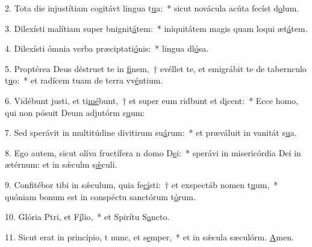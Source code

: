 2. Tota die injustítiam cogitávt lingua t\uline{u}a:~* sicut novácula acúta fecíst d\uline{o}lum.\par 
3. Dilexísti malítiam super bnignit\uline{á}tem:~* iniquitátem magis quam loqui æt\uline{á}tem.\par 
4. Dilexísti ómnia verba præciptati\uline{ó}nis:~* lingua dl\uline{ó}sa.\par 
5. Proptérea Deus déstruet te in \uline{fi}nem,~† evéllet te, et emigrábit te de tabernculo t\uline{u}o:~* et radícem tuam de terra vv\uline{é}ntium.\par 
6. Vidébunt justi, et ti\uline{mé}bunt,~† et super eum ridbunt et d\uline{i}cent:~* Ecce homo, qui non pósuit Deum adjutórm s\uline{u}um:\par 
7. Sed sperávit in multitúdine divitirum su\uline{á}rum:~* et præváluit in vanitát s\uline{u}a.\par 
8. Ego autem, sicut olíva fructífera n domo D\uline{e}i:~* sperávi in misericórdia Dei in ætérnum: et in sǽculm s\uline{ǽ}culi.\par 
9. Confitébor tibi in sǽculum, quia fe\uline{cí}sti:~† et exspectáb nomen t\uline{u}um,~* quóniam bonum est in conspéctu sanctórum t\uline{ó}rum.\par 
10. Glória Ptri, et F\uline{í}lio,~* et Spirítu S\uline{a}ncto.\par 
11. Sicut erat in princípio, t nunc, et s\uline{e}mper,~* et in sǽcula sæculórm. \uline{A}men.\par 
